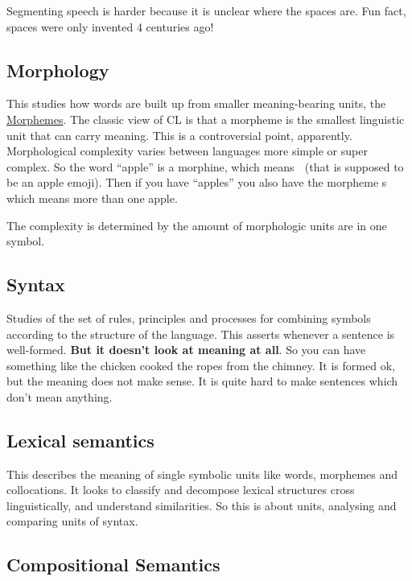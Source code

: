 \documentclass[
  11pt,
  british,
]{article}
\begin{document}
Segmenting speech is harder because it is unclear where the spaces are.
Fun fact, spaces were only invented 4 centuries ago!

\hypertarget{morphology}{%
\subsection{Morphology}\label{morphology}}

This studies how words are built up from smaller meaning-bearing units,
the \href{Morphemes.md}{Morphemes}. The classic view of CL is that a
morpheme is the smallest linguistic unit that can carry meaning. This is
a controversial point, apparently. Morphological complexity varies
between languages more simple or super complex. So the word ``apple'' is
a morphine, which means 🍎 (that is supposed to be an apple emoji). Then
if you have ``apples'' you also have the morpheme s which means more
than one apple.

The complexity is determined by the amount of morphologic units are in
one symbol.

\hypertarget{syntax}{%
\subsection{Syntax}\label{syntax}}

Studies of the set of rules, principles and processes for combining
symbols according to the structure of the language. This asserts
whenever a sentence is well-formed. \textbf{But it doesn't look at
meaning at all}. So you can have something like the chicken cooked the
ropes from the chimney. It is formed ok, but the meaning does not make
sense. It is quite hard to make sentences which don't mean anything.

\hypertarget{lexical-semantics}{%
\subsection{Lexical semantics}\label{lexical-semantics}}

This describes the meaning of single symbolic units like words,
morphemes and collocations. It looks to classify and decompose lexical
structures cross linguistically, and understand similarities. So this is
about units, analysing and comparing units of syntax.

\hypertarget{compositional-semantics}{%
\subsection{Compositional Semantics}\label{compositional-semantics}}
\end{document}
